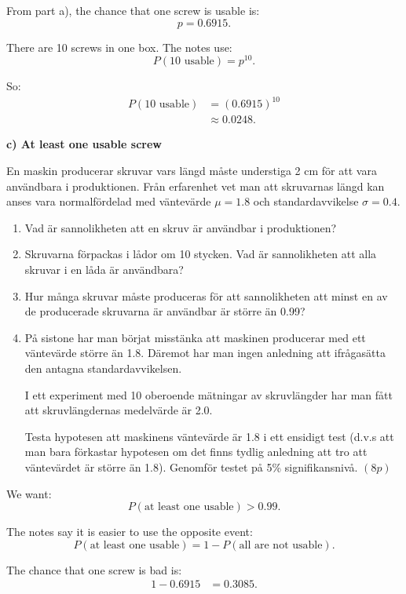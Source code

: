 \documentclass[10pt]{article}
\begin{document}
From part a), the chance that one screw is usable is:
\[
p=0.6915.
\]

There are 10 screws in one box.
The notes use:
\[
P(\text{10 usable})
=p^{10}.
\]

So:
\begin{align*}
P(\text{10 usable})
&=
(0.6915)^{10}
\\[2mm]
&\approx
0.0248.
\end{align*}

\textbf{c) At least one usable screw}

En maskin producerar skruvar vars längd måste
understiga 2 cm för att vara användbara i
produktionen. Från erfarenhet vet man att skruvarnas
längd kan anses vara normalfördelad med väntevärde
\(\mu=1.8\) och standardavvikelse \(\sigma=0.4\).

\begin{enumerate}[label=\alph*)]
\item Vad är sannolikheten att en skruv är användbar
i produktionen?

\item Skruvarna förpackas i lådor om 10 stycken.
Vad är sannolikheten att alla skruvar i en låda är
användbara?

\item Hur många skruvar måste produceras för att
sannolikheten att minst en av de producerade
skruvarna är användbar är större än 0.99?

\item På sistone har man börjat misstänka att
maskinen producerar med ett väntevärde större än
1.8. Däremot har man ingen anledning att ifrågasätta
den antagna standardavvikelsen.

I ett experiment med 10 oberoende mätningar av
skruvlängder har man fått att skruvlängdernas
medelvärde är 2.0.

Testa hypotesen att maskinens väntevärde är 1.8 i
ett ensidigt test (d.v.s att man bara förkastar
hypotesen om det finns tydlig anledning att tro att
väntevärdet är större än 1.8). Genomför testet på
5\% signifikansnivå. \((8p)\)
\end{enumerate}

We want:
\[
P(\text{at least one usable})>0.99.
\]

The notes say it is easier to use the opposite event:
\[
P(\text{at least one usable})
=
1-P(\text{all are not usable}).
\]

The chance that one screw is bad is:
\begin{align*}
1-0.6915
&=
0.3085.
\end{align*}
\end{document}
